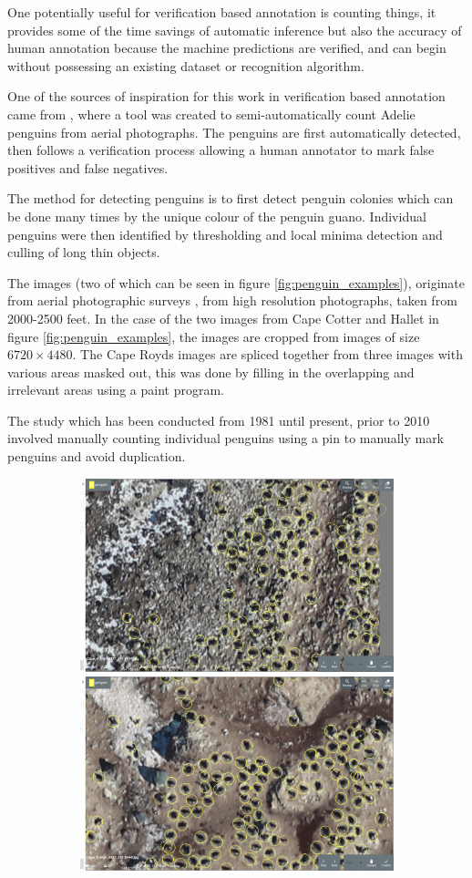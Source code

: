 One potentially useful for verification based annotation is counting things, it provides some of the time savings of automatic inference but also the accuracy of human annotation because the machine predictions are verified, and can begin without possessing an existing dataset or recognition algorithm.


One of the sources of inspiration for this work in verification based annotation came from \cite{McNeill2011}, where a tool was created to semi-automatically count Adelie penguins from aerial photographs. The penguins are first automatically detected, then follows a verification process allowing a human annotator to mark false positives and false negatives.

The method for detecting penguins is to first detect penguin colonies which can be done many times by the unique colour of the penguin guano. Individual penguins were then identified by thresholding and local minima detection and culling of long thin objects. 

The images (two of which can be seen in figure \ref{fig:penguin_examples}), originate from aerial photographic surveys \cite{Lyver2014}, from high resolution photographs, taken from 2000-2500 feet. In the case of the two images from Cape Cotter and Hallet in figure \ref{fig:penguin_examples}, the images are cropped from images of size $ 6720\times4480 $. The Cape Royds images are spliced together from three images with various areas masked out, this was done by filling in the overlapping and irrelevant areas using a paint program.

The study which has been conducted from 1981 until present, prior to 2010 involved manually counting individual penguins using a pin to manually mark penguins and avoid duplication. 

\begin{figure}[h!]
\centering
\begin{subfigure}[t]{1.0\linewidth}
  \includegraphics[width=0.475\linewidth]{figures/annotation/screenshots/penguins_aerial.png}
  \hfill
  \includegraphics[width=0.475\linewidth]{figures/annotation/screenshots/penguins_aerial2.png}
  \caption{}
\end{subfigure}

\caption{ }
\label {fig:penguin_aerial_examples}
\end{figure}




